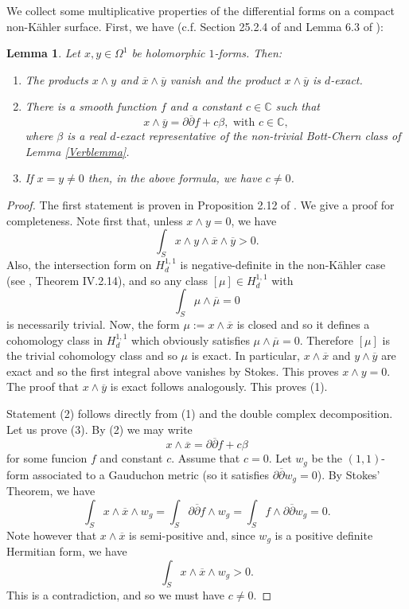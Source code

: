 \documentclass[a4paper]{amsart}
\newtheorem{lemm}[theo]{Lemma}
\theoremstyle{definition}
\newcommand{\CC}{\mathbb{C}}
\newcommand{\ov}{\overline}
\newcommand{\del}{\partial}
\newcommand{\delb}{{\overline\partial}}
\begin{document}
We collect some multiplicative properties of the differential forms on a compact non-Kähler surface.
First, we have (c.f. Section 25.2.4 of \cite{Verbook} and Lemma 6.3 of \cite{La}):

\begin{lemm}\label{Verbmulti}
Let $x,y\in\Omega^1$ be holomorphic $1$-forms. Then:
\begin{enumerate}
 \item The products $x\wedge y$ and $\ov{x}\wedge \ov{y}$ vanish and the product $x\wedge\ov y$ is $d$-exact.
 \item There is a smooth function $f$ and a constant $c\in\CC$ such that
  \[x\wedge \ov y=\del\delb f + c\beta,\text{ with }c\in\CC,\]
  where $\beta$ is a real $d$-exact representative of the non-trivial Bott-Chern class of Lemma \ref{Verblemma}.
\item If $x=y\neq 0$ then, in the above formula, we have $c\neq 0$.
\end{enumerate}
\end{lemm}
\begin{proof}
The first statement is proven in Proposition 2.12 of \cite{Verbook}. We give a proof for completeness.
Note first that, unless $x\wedge y=0$, we have
\[\int_S x\wedge y\wedge \ov x\wedge \ov y>0.\]
Also, the intersection form on $H^{1,1}_d$ is negative-definite in the non-Kähler case (see \cite{Barth}, Theorem IV.2.14), and so any class $[\mu]\in H^{1,1}_d$ with
\[\int_S \mu\wedge \ov \mu=0\]
is necessarily trivial.
Now, the form $\mu:=x\wedge \ov x$ is closed and so it defines a cohomology class in $H^{1,1}_d$ which obviously satisfies $\mu\wedge\ov \mu=0$. Therefore $[\mu]$ is the trivial cohomology class and so $\mu$ is exact. In particular,
 $x\wedge \ov x$ and $y\wedge \ov y$ are exact and so the first integral above vanishes by Stokes. This proves $x\wedge y=0$.
The proof that
 $x\wedge \ov y$ is exact follows analogously. This proves (1).

Statement (2) follows directly from (1) and the double complex decomposition.
 Let us prove (3). By (2) we may write
 \[x\wedge \ov x=\del\delb f+c\beta\]
 for some funcion $f$ and constant $c$.
 Assume that $c=0$. Let $w_g$ be the $(1,1)$-form associated to a Gauduchon metric (so it satisfies $\del\delb w_g=0$). By Stokes' Theorem, we have
 \[\int_S x\wedge \ov x\wedge w_g=\int_S \del\delb f\wedge w_g=\int_Sf\wedge \del\delb w_g=0.\]
 Note however that $x\wedge \ov x$ is semi-positive and, since $w_g$ is a positive definite Hermitian form, we have 
 \[\int_S x\wedge\ov x\wedge w_g>0.\]
 This is a contradiction, and so we must have $c\neq 0$.
\end{proof}
\end{document}

